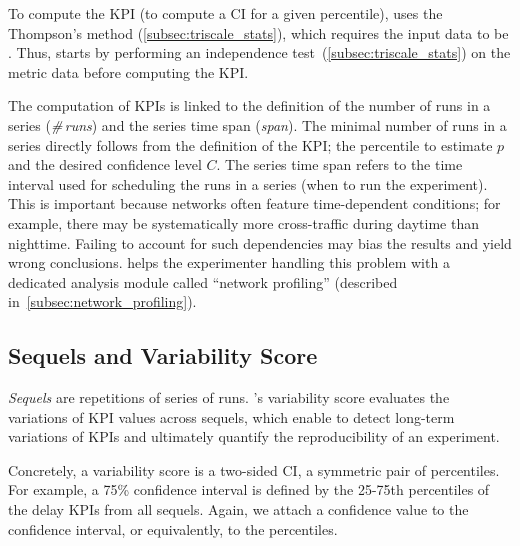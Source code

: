 To compute the KPI (\ie to compute a CI for a given percentile), \triscale uses the Thompson's method (\cref{subsec:triscale_stats}), which requires the input data to be \iid.
Thus, \triscale starts by performing an independence test~(\cref{subsec:triscale_stats})
on the metric data before computing the KPI.


The computation of \triscale KPIs is linked to the definition of the number of runs in a series (\emph{\#\,runs}) and the series time span (\emph{span}).
The minimal number of runs in a series directly follows from the definition of the KPI; \ie the percentile to estimate $p$ and the desired confidence level $C$.
The series time span refers to the time interval used for scheduling the runs in a series (\ie when to run the experiment).
This is important because networks often feature time-dependent conditions; for example, there may be systematically more cross-traffic during daytime than nighttime. Failing to account for such dependencies may bias the results and yield wrong conclusions.
\triscale helps the experimenter handling this problem with a dedicated analysis module called ``network profiling'' (described in~\cref{subsec:network_profiling}).



\subsection{Sequels and Variability Score}
\label{subsec:repeatability}

\emph{Sequels} are repetitions of series of runs.
\triscale's variability score evaluates the variations of KPI values across sequels, which enable to detect long-term variations of KPIs and ultimately quantify the reproducibility of an experiment.

Concretely, a variability score is a two-sided CI, \ie a symmetric pair of percentiles. For example, a 75\% confidence interval is defined by the 25-75th percentiles of the delay KPIs from all sequels. Again, we attach a confidence value to the confidence interval, or equivalently, to the percentiles.

